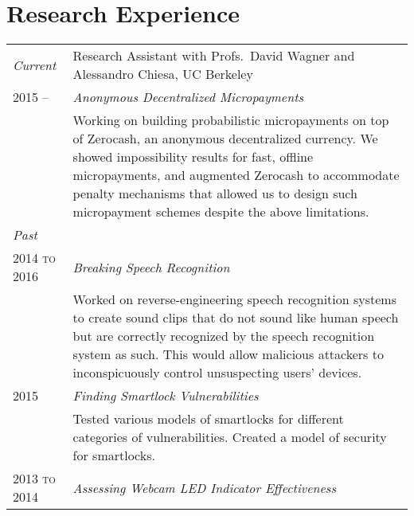 \documentclass[10pt]{article}
\begin{document}
\section{Research Experience}
\begin{tabular}{R{2cm}p{13cm}}

  \emph{Current}          & Research Assistant with Profs.\ David Wagner and
                            Alessandro Chiesa, UC Berkeley\\
  \textsc{2015 --} & \emph{Anonymous Decentralized Micropayments}\\
                       & \footnotesize{%
                            Working on building probabilistic micropayments on top of
                            Zerocash, an anonymous decentralized currency. We
                            showed impossibility results for fast,
                            offline micropayments, and augmented Zerocash to 
                            accommodate penalty mechanisms that allowed us to 
                            design such micropayment schemes despite the above limitations.
                            }\\

  \emph{Past}             &\\
  \textsc{2014 to 2016} & \emph{Breaking Speech Recognition}\\
                          &\footnotesize{%
                             Worked on reverse-engineering speech recognition
                             systems to create sound clips that do not sound
                             like human speech but are correctly recognized by
                             the speech recognition system as such. This would
                             allow malicious attackers to inconspicuously
                             control unsuspecting users’ devices.

                            }\\
  \textsc{2015}     & \emph{Finding Smartlock Vulnerabilities}\\

                          &\footnotesize{%
                             Tested various models of smartlocks for different
                             categories of vulnerabilities. Created a model of
                             security for smartlocks.

                            }\\
  \textsc{2013 to 2014} & \emph{Assessing Webcam LED Indicator Effectiveness}\\


\end{tabular}
\end{document}
